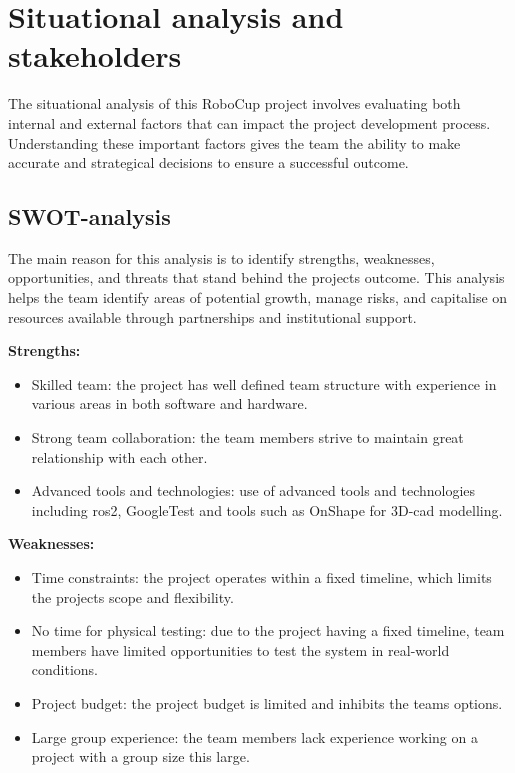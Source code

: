 \section{Situational analysis and stakeholders}
\label{section:situational_analysis_and_stakeholders}

The situational analysis of this RoboCup project involves evaluating both internal and external factors that can impact the project development process. Understanding these important factors gives the team the ability to make accurate and strategical decisions to ensure a successful outcome.  


\subsection{SWOT-analysis}
The main reason for this analysis is to identify strengths, weaknesses, opportunities, and threats that stand behind the projects outcome.  This analysis helps the team identify areas of potential growth, manage risks, and capitalise on resources available through partnerships and institutional support. 


\textbf{Strengths:}
\begin{itemize}
    \item Skilled team: the project has well defined team structure with experience in various areas in both software and hardware. 
    \item Strong team collaboration: the team members strive to maintain great relationship with each other.   
    \item Advanced tools and technologies: use of advanced tools and technologies including \ac{ros2}, GoogleTest and tools such as OnShape for 3D-\acs{cad} modelling. 
\end{itemize}

\textbf{Weaknesses:}
\begin{itemize}
    \item Time constraints: the project operates within a fixed timeline, which limits the projects scope and flexibility. 
    \item No time for physical testing: due to the project having a fixed timeline, team members have limited opportunities to test the system in real-world conditions.
    \item Project budget: the project budget is limited and inhibits the teams options. 
    \item Large group experience: the team members lack experience working on a project with a group size this large.
\end{itemize}

